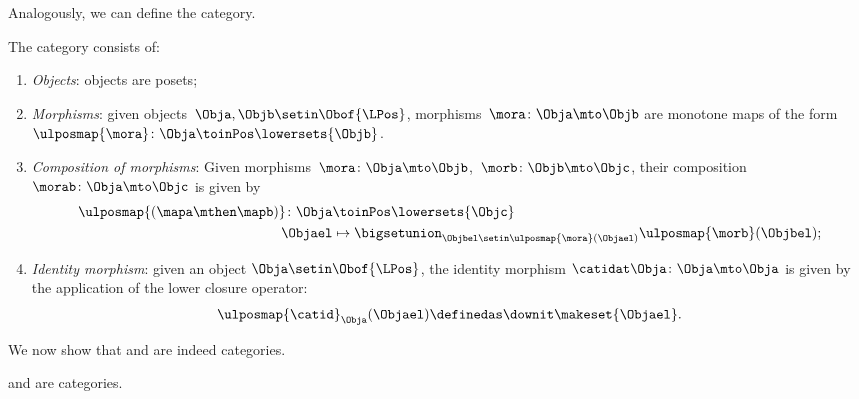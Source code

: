 Analogously, we can define the \LPos category.
\begin{definition}
    \label{def:lpos_cat}
    The category \LPos consists of:
    \begin{enumerate}
        \item \emph{Objects}: objects are posets;
        \item \emph{Morphisms}: given objects~$\Obja,\Objb\setin \Obof{\LPos}$, morphisms~$\mora\colon \Obja\mto \Objb$ are monotone maps of the form~$\ulposmap{\mora} \colon \Obja \toinPos \lowersets{\Objb}$.
        \item \emph{Composition of morphisms}: Given morphisms~$\mora \colon \Obja \mto \Objb$,~$\morb \colon \Objb\mto \Objc$, their composition~$\morab\colon \Obja\mto \Objc$ is given by
              \begin{equation}
                  \begin{aligned}
                      \ulposmap{(\mapa \mthen \mapb)} \colon \Obja & \toinPos \lowersets{\Objc} \\
                      \Objael                                      & \mapsto \bigsetunion_{\Objbel\setin \ulposmap{\mora} (\Objael)}\ulposmap{\morb}(\Objbel);
                  \end{aligned}
              \end{equation}
        \item \emph{Identity morphism}: given an object $\Obja\setin \Obof{\LPos}$, the identity morphism $\catidat\Obja \colon \Obja \mto \Obja$ is given by the application of the lower closure operator:
              \begin{equation}
                  \ulposmap{\catid}_\Obja(\Objael)\definedas \downit\makeset{\Objael}.
              \end{equation}
    \end{enumerate}
\end{definition}

We now show that \UPos and \LPos are indeed categories.

\begin{lemma}
    \label{lem:upos_lpos_cats}
    \UPos and \LPos are categories.
\end{lemma}

